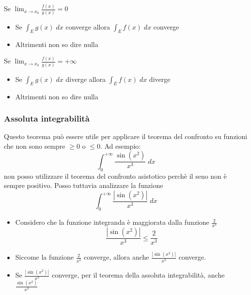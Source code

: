Se $ \lim_{x \to x_0} \frac{f\left( x \right) }{g\left( x \right) }  = 0 $
\begin{itemize}
	\item Se $ \int_{E} g\left( x \right)  \; dx $ converge allora $ \int_E f\left( x \right)  \; dx $ converge
	\item Altrimenti non so dire nulla
\end{itemize}
Se $ \lim_{x \to x_0} \frac{f\left( x \right) }{g\left( x \right) }  = +\infty $
\begin{itemize}
	\item Se $ \int_{E} g\left( x \right)  \; dx $ diverge allora $ \int_E f\left( x \right)  \; dx $ diverge
	\item Altrimenti non so dire nulla
\end{itemize}
\subsubsection*{Assoluta integrabilità}
Questo teorema può essere utile per applicare il teorema del confronto su funzioni che non sono sempre $ \ge 0  $ o $ \le 0 $.
Ad esempio:
\[
	\int_{0}^{+ \infty} \frac{\sin \left( x^2 \right) }{x^3} \; dx
\]
non posso utilizzare il teorema del confronto asistotico perchè il seno non è sempre positivo. Posso tuttavia analizzare la funzione
\[
	\int_{0}^{+ \infty} \frac{\left|\sin \left( x^2 \right) \right| }{x^3} \; dx
\]
\begin{itemize}
	\item Considero che la funzione integranda è maggiorata dalla funzione $ \frac{2}{x^3} $
	      \[
		      \frac{\left|\sin \left( x^2 \right) \right|}{x^3} \le \frac{2}{x^3}
	      \]
	\item Siccome la funzione $ \frac{2}{x^3} $ converge, allora anche $ \frac{\left|\sin \left( x^2 \right) \right|}{x^3} $ converge.
	\item  Se $ \frac{\left|\sin \left( x^2 \right) \right|}{x^3} $ converge, per il teorema della assoluta integrabilità, anche $\frac{\sin \left( x^2 \right) }{x^3} $
\end{itemize}
